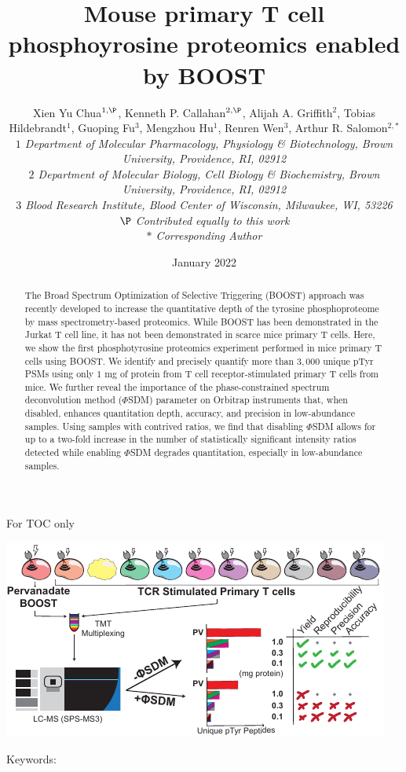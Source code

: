 \documentclass[journal=jprobs,manuscript=article]{achemso}
\title{Mouse primary T cell phosphoyrosine proteomics enabled by BOOST}
\author{Xien Yu Chua$^{1,\P}$, Kenneth P. Callahan$^{2,\P}$, Alijah A. Griffith$^{2}$, Tobias Hildebrandt$^{1}$, Guoping Fu$^{3}$, Mengzhou Hu$^{1}$, Renren Wen$^{3}$, Arthur R. Salomon$^{2,*}$
\\
\singlespacing
\textit{\small{$1$ Department of Molecular Pharmacology, Physiology \& Biotechnology, Brown University, Providence, RI, 02912}}
\\
\textit{\small{$2$ Department of Molecular Biology, Cell Biology \& Biochemistry, Brown University, Providence, RI, 02912}}
\\
\textit{\small{$3$ Blood Research Institute, Blood Center of Wisconsin, Milwaukee, WI, 53226}}
\\
\textit{\small{$\P$ Contributed equally to this work}}
\\
\textit{\small{$*$} Corresponding Author}\tiny}
\date{January 2022}
\begin{document}
\maketitle

\begin{tocentry}

For TOC only

\includegraphics{figures/graphical_toc/mouse_turbotmt_gtoc.pdf}
\end{tocentry}


\begin{abstract}

The Broad Spectrum Optimization of Selective Triggering (BOOST) approach was recently developed to increase the quantitative depth of the tyrosine phosphoproteome by mass spectrometry-based proteomics. While BOOST has been demonstrated in the Jurkat T cell line, it has not been demonstrated in scarce mice primary T cells. Here, we show the first phosphotyrosine proteomics experiment performed in mice primary T cells using BOOST. We identify and precisely quantify more than $3{,}000$ unique pTyr PSMs using only $1$ mg of protein from T cell receptor-stimulated primary T cells from mice. We further reveal the importance of the phase-constrained spectrum deconvolution method ($\Phi$SDM) parameter on Orbitrap instruments that, when disabled, enhances quantitation depth, accuracy, and precision in low-abundance samples. Using samples with contrived ratios, we find that disabling $\Phi$SDM allows for up to a two-fold increase in the number of statistically significant intensity ratios detected while enabling $\Phi$SDM degrades quantitation, especially in low-abundance samples.


\end{abstract}

Keywords:
\end{document}

